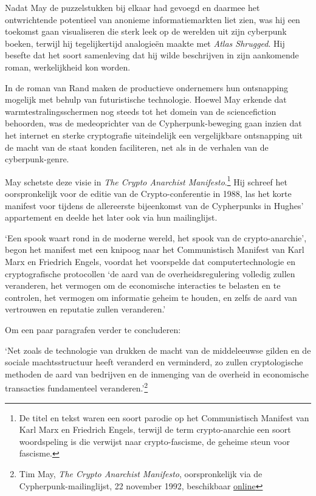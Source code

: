 \documentclass[
  a5paper,
  smalldemyvopaper,11pt,twoside,onecolumn,openright,extrafontsizes,
hidelinks]{memoir}
\begin{document}
Nadat May de puzzelstukken bij elkaar had gevoegd en daarmee het
ontwrichtende potentieel van anonieme informatiemarkten liet zien, was
hij een toekomst gaan visualiseren die sterk leek op de werelden uit
zijn cyberpunk boeken, terwijl hij tegelijkertijd analogieën maakte met
\emph{Atlas Shrugged}. Hij besefte dat het soort samenleving dat hij
wilde beschrijven in zijn aankomende roman, werkelijkheid kon worden.

In de roman van Rand maken de productieve ondernemers hun ontsnapping
mogelijk met behulp van futuristische technologie. Hoewel May erkende
dat warmtestralingsschermen nog steeds tot het domein van de
sciencefiction behoorden, was de medeoprichter van de
Cypherpunk-beweging gaan inzien dat het internet en sterke cryptografie
uiteindelijk een vergelijkbare ontsnapping uit de macht van de staat
konden faciliteren, net als in de verhalen van de cyberpunk-genre.

May schetste deze visie in \emph{The Crypto Anarchist
Manifesto}.\footnote{De titel en tekst waren een soort parodie op het
  Communistisch Manifest van Karl Marx en Friedrich Engels, terwijl de
  term crypto-anarchie een soort woordspeling is die verwijst naar
  crypto-fascisme, de geheime steun voor fascisme.} Hij schreef het
oorspronkelijk voor de editie van de Crypto-conferentie in 1988, las het
korte manifest voor tijdens de allereerste bijeenkomst van de
Cypherpunks in Hughes' appartement en deelde het later ook via hun
mailinglijst.

`Een spook waart rond in de moderne wereld, het spook van de
crypto-anarchie', begon het manifest met een knipoog naar het
Communistisch Manifest van Karl Marx en Friedrich Engels, voordat het
voorspelde dat computertechnologie en cryptografische protocollen `de
aard van de overheidsregulering volledig zullen veranderen, het vermogen
om de economische interacties te belasten en te controlen, het vermogen
om informatie geheim te houden, en zelfs de aard van vertrouwen en
reputatie zullen veranderen.'

Om een paar paragrafen verder te concluderen:

`Net zoals de technologie van drukken de macht van de middeleeuwse
gilden en de sociale machtsstructuur heeft veranderd en verminderd, zo
zullen cryptologische methoden de aard van bedrijven en de inmenging van
de overheid in economische transacties fundamenteel
veranderen.'\footnote{Tim May, \emph{The Crypto Anarchist Manifesto},
  oorspronkelijk via de Cypherpunk-mailinglijst, 22 november 1992,
  beschikbaar
  \href{https://cypherpunks.venona.com/date/1992/11/msg00204.html}{online}}
\end{document}
